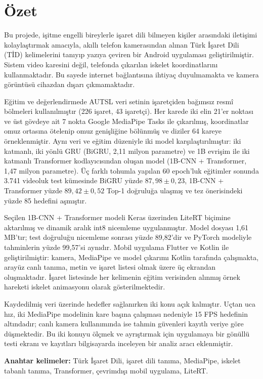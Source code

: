 \clearpage
\section{Özet}
\label{CH:Ozet}

Bu projede, işitme engelli bireylerle işaret dili bilmeyen kişiler arasındaki iletişimi
kolaylaştırmak amacıyla, akıllı telefon kamerasından alınan Türk İşaret Dili (TİD)
kelimelerini tanıyıp yazıya çeviren bir Android uygulaması geliştirilmiştir. Sistem video
karesini değil, telefonda çıkarılan iskelet koordinatlarını kullanmaktadır. Bu sayede
internet bağlantısına ihtiyaç duyulmamakta ve kamera görüntüsü cihazdan dışarı
çıkmamaktadır.

Eğitim ve değerlendirmede AUTSL veri setinin işaretçiden bağımsız resmî bölmeleri
kullanılmıştır (226 işaret, 43 işaretçi). Her karede iki elin 21'er noktası ve üst gövdeye
ait 7 nokta Google MediaPipe Tasks ile çıkarılmış, koordinatlar omuz ortasına ötelenip
omuz genişliğine bölünmüş ve diziler 64 kareye örneklenmiştir. Aynı veri ve eğitim
düzeniyle iki model karşılaştırılmıştır: iki katmanlı, iki yönlü GRU (BiGRU, 2,11 milyon
parametre) ve 1B evrişim ile iki katmanlı Transformer kodlayıcısından oluşan model
(1B-CNN + Transformer, 1,47 milyon parametre). Üç farklı tohumla yapılan 60 epoch'luk
eğitimler sonunda 3.741 videoluk test kümesinde BiGRU yüzde $87{,}98 \pm 0{,}23$,
1B-CNN + Transformer yüzde $89{,}42 \pm 0{,}52$ Top-1 doğruluğa ulaşmış ve tez
önerisindeki yüzde 85 hedefini aşmıştır.

Seçilen 1B-CNN + Transformer modeli Keras üzerinden LiteRT biçimine aktarılmış ve
dinamik aralık int8 nicemleme uygulanmıştır. Model dosyası 1,61 MB'tır; test
doğruluğu nicemleme sonrası yüzde 89,82'dir ve PyTorch modeliyle tahminlerin yüzde
99,57'si aynıdır. Mobil uygulama Flutter ve Kotlin ile geliştirilmiştir: kamera,
MediaPipe ve model çıkarımı Kotlin tarafında çalışmakta, arayüz canlı tanıma, metin ve
işaret listesi olmak üzere üç ekrandan oluşmaktadır. İşaret listesinde her kelimenin
eğitim verisinden alınmış örnek hareketi iskelet animasyonu olarak gösterilmektedir.

Kaydedilmiş veri üzerinde hedefler sağlanırken iki konu açık kalmıştır. Uçtan uca hız,
iki MediaPipe modelinin kare başına çalışması nedeniyle 15 FPS hedefinin altındadır;
canlı kamera kullanımında ise tahmin güvenleri kayıtlı veriye göre düşmektedir. Bu iki
konuyu ölçmek ve ayrıştırmak için uygulamaya bir gönüllü testi ekranı ve kayıtları
bilgisayarda inceleyen bir analiz aracı eklenmiştir.

\vspace{3mm}
\noindent\textbf{Anahtar kelimeler:} Türk İşaret Dili, işaret dili tanıma, MediaPipe,
iskelet tabanlı tanıma, Transformer, çevrimdışı mobil uygulama, LiteRT.

\clearpage
